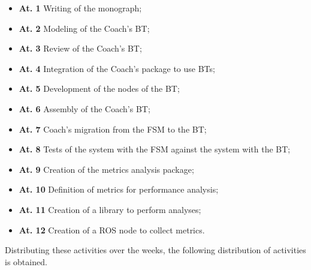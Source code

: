 \begin{itemize}
    \item {\bf At. 1} Writing of the monograph;
    \item {\bf At. 2} Modeling of the Coach's BT;
    \item {\bf At. 3} Review of the Coach's BT;
    \item {\bf At. 4} Integration of the Coach's package to use BTs;
    \item {\bf At. 5} Development of the nodes of the BT;
    \item {\bf At. 6} Assembly of the Coach's BT;
    \item {\bf At. 7} Coach's migration from the FSM to the BT;
    \item {\bf At. 8} Tests of the system with the FSM against the system with the BT;
    \item {\bf At. 9} Creation of the metrics analysis package;
    \item {\bf At. 10} Definition of metrics for performance analysis;
    \item {\bf At. 11} Creation of a library to perform analyses;
    \item {\bf At. 12} Creation of a ROS node to collect metrics.
\end{itemize}

Distributing these activities over the weeks, the following distribution of activities is obtained.

